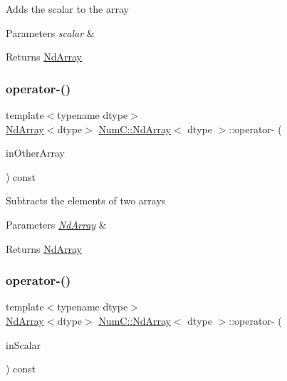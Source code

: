 Adds the scalar to the array


\begin{DoxyParams}{Parameters}
{\em scalar} & \\
\hline
\end{DoxyParams}
\begin{DoxyReturn}{Returns}
\mbox{\hyperlink{class_num_c_1_1_nd_array}{Nd\+Array}} 
\end{DoxyReturn}
\mbox{\label{class_num_c_1_1_nd_array_aa5625d7239485a21fd2cc59cec55dfb2}} 
\subsubsection{\texorpdfstring{operator-\/()}{operator-()}\hspace{0.1cm}{\footnotesize\ttfamily [1/2]}}
{\footnotesize\ttfamily template$<$typename dtype$>$ \\
\mbox{\hyperlink{class_num_c_1_1_nd_array}{Nd\+Array}}$<$dtype$>$ \mbox{\hyperlink{class_num_c_1_1_nd_array}{Num\+C\+::\+Nd\+Array}}$<$ dtype $>$\+::operator-\/ (\begin{DoxyParamCaption}\item[{const \mbox{\hyperlink{class_num_c_1_1_nd_array}{Nd\+Array}}$<$ dtype $>$ \&}]{in\+Other\+Array }\end{DoxyParamCaption}) const\hspace{0.3cm}{\ttfamily [inline]}}

Subtracts the elements of two arrays


\begin{DoxyParams}{Parameters}
{\em \mbox{\hyperlink{class_num_c_1_1_nd_array}{Nd\+Array}}} & \\
\hline
\end{DoxyParams}
\begin{DoxyReturn}{Returns}
\mbox{\hyperlink{class_num_c_1_1_nd_array}{Nd\+Array}} 
\end{DoxyReturn}
\mbox{\label{class_num_c_1_1_nd_array_a3a7f3f151033d72f08d1a0875e7f0c7f}} 
\subsubsection{\texorpdfstring{operator-\/()}{operator-()}\hspace{0.1cm}{\footnotesize\ttfamily [2/2]}}
{\footnotesize\ttfamily template$<$typename dtype$>$ \\
\mbox{\hyperlink{class_num_c_1_1_nd_array}{Nd\+Array}}$<$dtype$>$ \mbox{\hyperlink{class_num_c_1_1_nd_array}{Num\+C\+::\+Nd\+Array}}$<$ dtype $>$\+::operator-\/ (\begin{DoxyParamCaption}\item[{dtype}]{in\+Scalar }\end{DoxyParamCaption}) const\hspace{0.3cm}{\ttfamily [inline]}}


